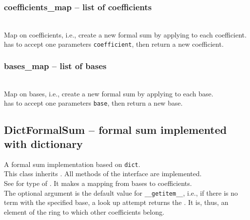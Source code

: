  \subsubsection{coefficients\_map -- list of coefficients}
   \\
   \spacing
   \quad Map on coefficients, i.e., create a new formal sum by applying
    to each coefficient.\\
   \spacing
   \quad {} has to accept one parameters {\tt coefficient},
   then return a new coefficient.
 \subsubsection{bases\_map -- list of bases}
   \\
   \spacing
   \quad Map on bases, i.e., create a new formal sum by applying
    to each base.\\
   \spacing
   \quad {} has to accept one parameters {\tt base},
   then return a new base.

\C
%
 \subsection{DictFormalSum -- formal sum implemented with dictionary}
  A formal sum implementation based on {\tt dict}.\\
  \spacing
  \quad This class inherits .
  All methods of the interface are implemented.
 \initialize
  \\
  \spacing
  \quad See  for type of .
  It makes a mapping from bases to coefficients.\\
  \quad The optional argument  is the default value for
  {\tt \_\_getitem\_\_}, i.e., if there is no term with the specified
  base, a look up attempt returns the .  It is,
  thus, an element of the ring to which other coefficients belong.

